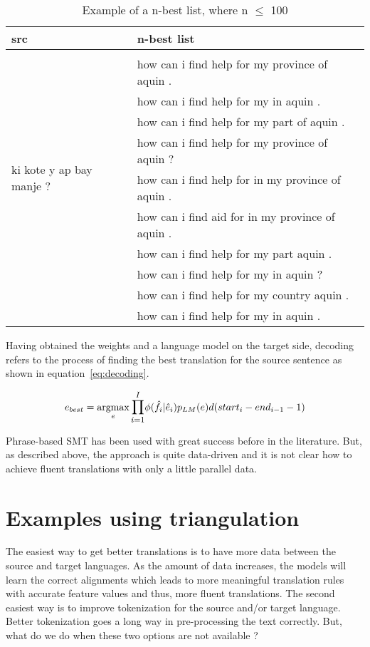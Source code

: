 \begin{table*}
	\begin{tabular}{p{}p{}}
		\toprule
		src & n-best list \\
		\toprule
		\multirow{10}{*}{ki kote y ap bay manje ?}  & \\ 
		& how can i find help for my province of aquin . \\
		& how can i find help for my in aquin . \\
		& how can i find help for my part of aquin . \\
		& how can i find help for my province of aquin ? \\
		& how can i find help for in my province of aquin . \\
		& how can i find aid for in my province of aquin . \\
		& how can i find help for my part aquin . \\
		& how can i find help for my in aquin ?  \\
		& how can i find help for my country aquin . \\
		& how can i find help for my in aquin . \\
		\bottomrule
	\end{tabular}
	\caption{Example of a n-best list, where n $\leq$ 100}
	\label{table:nbest}
\end{table*}




Having obtained the weights and a language model on the target side, decoding refers to the process of finding the best translation for the source sentence as shown in equation~\eqref{eq:decoding}. 

\begin{equation} \label{eq:decoding}
	e_{best} = \argmax_{e} \mathlarger{\prod\limits_{i=1}^I} \phi(\hat{f}_{i} | \hat{e}_{i})p_{LM}(e)d(start_{i} - end_{i-1}-1)
\end{equation}


Phrase-based SMT has been used with great success before in the literature. But, as described above, the approach is quite data-driven and it is not clear how to achieve fluent translations with only a little parallel data.  

\section{Examples using triangulation}

The easiest way to get better translations is to have more data between the source and target languages. As the amount of data increases, the models will learn the correct alignments which leads to more meaningful translation rules with accurate feature values and thus, more fluent translations. The second easiest way is to improve tokenization for the source and/or target language. Better tokenization goes a long way in pre-processing the text correctly. But, what do we do when these two options are not available ? 

